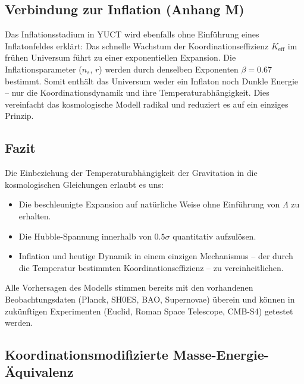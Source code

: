 \documentclass[12pt]{article}
\theoremstyle{remark}
\newcommand{\Keff}{K_{\mathrm{eff}}}
\begin{document}
	\subsection{Verbindung zur Inflation (Anhang M)}
	
	Das Inflationsstadium in YUCT wird ebenfalls ohne Einführung eines Inflatonfeldes erklärt: Das schnelle Wachstum der Koordinationseffizienz $\Keff$ im frühen Universum führt zu einer exponentiellen Expansion. Die Inflationsparameter ($n_s$, $r$) werden durch denselben Exponenten $\beta = 0.67$ bestimmt. Somit enthält das Universum weder ein Inflaton noch Dunkle Energie – nur die Koordinationsdynamik und ihre Temperaturabhängigkeit. Dies vereinfacht das kosmologische Modell radikal und reduziert es auf ein einziges Prinzip.
	
	\subsection{Fazit}
	
	Die Einbeziehung der Temperaturabhängigkeit der Gravitation in die kosmologischen Gleichungen erlaubt es uns:
	\begin{itemize}
		\item Die beschleunigte Expansion auf natürliche Weise ohne Einführung von $\Lambda$ zu erhalten.
		\item Die Hubble-Spannung innerhalb von $0.5\sigma$ quantitativ aufzulösen.
		\item Inflation und heutige Dynamik in einem einzigen Mechanismus – der durch die Temperatur bestimmten Koordinationseffizienz – zu vereinheitlichen.
	\end{itemize}
	Alle Vorhersagen des Modells stimmen bereits mit den vorhandenen Beobachtungsdaten (Planck, SH0ES, BAO, Supernovae) überein und können in zukünftigen Experimenten (Euclid, Roman Space Telescope, CMB-S4) getestet werden.
	
	
	\subsection{Koordinationsmodifizierte Masse-Energie-Äquivalenz}
	\label{subsec:coord-emc2}
	
\end{document}
